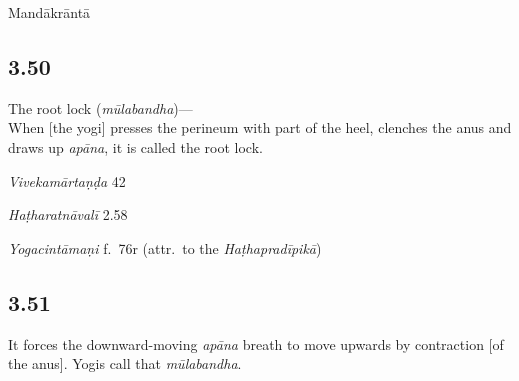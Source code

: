 \begin{ekdosis}
\begin{philcomm}[hp03_049_2]
\end{philcomm}

\begin{metre}[hp03_049_2]
Mandākrāntā 
\end{metre}

\subsection*{3.50}
\begin{translation}[hp03_050]
The root lock (\emph{mūlabandha})—\\
When [the yogi] presses the perineum with part of the heel, clenches the anus and draws up \emph{apāna}, it is called the root lock.
\end{translation}

\begin{sources}[hp03_050]
\emph{Vivekamārtaṇḍa} 42
\begin{versinnote}
\end{versinnote}
\end{sources}

\begin{testimonia}[hp03_050]
\emph{Haṭharatnāvalī} 2.58
\begin{versinnote}
\end{versinnote}

\emph{Yogacintāmaṇi} f.~76r (attr.~to the \emph{Haṭhapradīpikā})
\begin{versinnote}
\end{versinnote}

\end{testimonia}


\subsection*{3.51}
\begin{translation}[hp03_051]
It forces the downward-moving \emph{apāna} breath to move upwards by contraction [of the anus]. Yogis call that \emph{mūlabandha}.
\end{translation}


\end{ekdosis}
